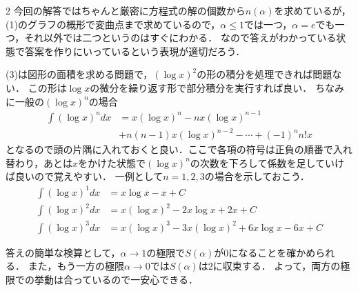 \documentclass[../../main.tex]{subfiles}
\begin{document}
\begin{multicols}{2}
  今回の解答ではちゃんと厳密に方程式の解の個数から$n(\alpha)$を求めているが，
  (1)のグラフの概形で変曲点まで求めているので，$\alpha \le 1$では一つ，$\alpha=e$でも一つ，それ以外では二つというのはすぐにわかる．
  なので答えがわかっている状態で答案を作りにいっているという表現が適切だろう．

  (3)は図形の面積を求める問題で，$(\log x)^2$の形の積分を処理できれば問題ない．
  この形は$\log x$の微分を繰り返す形で部分積分を実行すれば良い．
  ちなみに一般の$(\log x)^{n}$の場合
  \begin{align}
    \int \left(\log x\right)^n dx
    & = x\left(\log x\right)^n - nx\left(\log x\right)^{n-1} \\
    & + n(n-1)x\left(\log x\right)^{n-2}-\cdots +(-1)^n n!x
  \end{align}
  となるので頭の片隅に入れておくと良い．ここで各項の符号は正負の順番で入れ替わり，あとは$x$をかけた状態で$(\log x)^{n}$の次数を下ろして係数を足していけば良いので覚えやすい．
  一例として$n=1,2,3$の場合を示しておこう．
  \begin{align}
    \int \left(\log x\right)^1 dx & = x\log x - x + C                                \\
    \int \left(\log x\right)^2 dx & = x(\log x)^2 - 2x\log x + 2x + C                \\
    \int \left(\log x\right)^3 dx & = x(\log x)^3 - 3x(\log x)^2 + 6x\log x - 6x + C
  \end{align}

  答えの簡単な検算として，$\alpha\to 1$の極限で$S(\alpha)$が$0$になることを確かめられる．
  また，もう一方の極限$\alpha\to 0$では$S(\alpha)$は$2$に収束する．
  よって，両方の極限での挙動は合っているので一安心できる．

  \newpage
\end{multicols}
\end{document}
